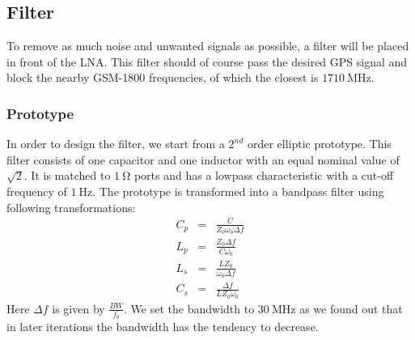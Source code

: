 \documentclass[a4paper]{article}        %
\begin{document}
		
	\subsection{Filter}
  To remove as much noise and unwanted signals as possible, a filter will be placed in front of the LNA. This filter should of course pass the desired GPS signal and block the nearby GSM-1800 frequencies, of which the closest is $\SI{1710}{\mega\hertz}$.
  \subsubsection{Prototype}
  In order to design the filter, we start from a $2^{nd}$ order elliptic prototype. This filter consists of one capacitor and one inductor with an equal nominal value of $\sqrt{2}$.  It is matched to $\SI{1}{\ohm}$ ports and has a lowpass characteristic with a cut-off frequency of $\SI{1}{\hertz}$.
  The prototype is transformed into a bandpass filter using following transformations:
  \begin{eqnarray*}
    C_p &=& \frac{C}{Z_0 \omega_0 \Delta f}\\
    L_p &=& \frac{Z_0 \Delta f}{C \omega_0}\\
    L_s &=& \frac{L Z_0}{\omega_0 \Delta f}\\
    C_s &=& \frac{\Delta f}{L Z_0 \omega_0}
  \end{eqnarray*}
  Here $\Delta f$ is given by $\frac{BW}{f_0}$. We set the bandwidth to $\SI{30}{\mega\hertz}$ as we found out that in later iterations the bandwidth has the tendency to decrease.
\end{document}
